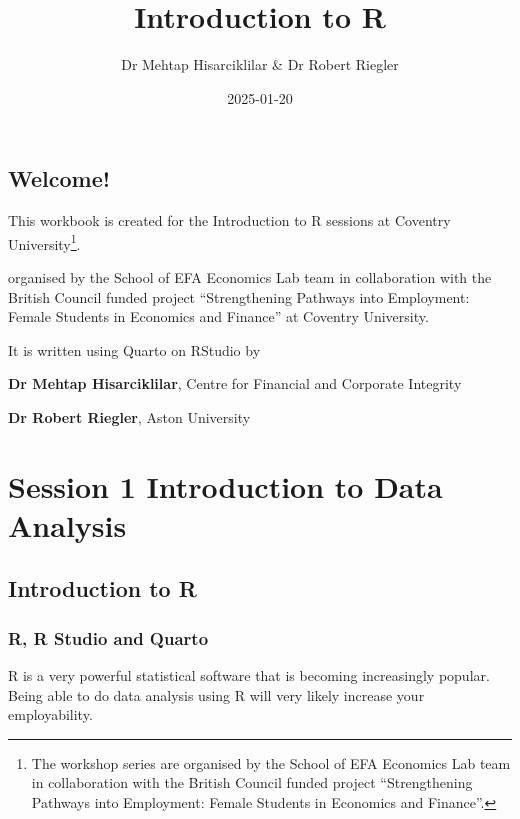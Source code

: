 \documentclass[
  letterpaper,
  DIV=11,
  numbers=noendperiod]{scrreprt}
\title{Introduction to R}
\author{Dr Mehtap Hisarciklilar \& Dr Robert Riegler}
\date{2025-01-20}
\renewcommand*\contentsname{Table of contents}
\newcommand\contentsname{Table of contents}
\begin{document}
\maketitle

\renewcommand*\contentsname{Table of contents}
{
\hypersetup{linkcolor=}
\setcounter{tocdepth}{2}
\tableofcontents
}


\chapter*{Welcome!}\label{welcome}


This workbook is created for the Introduction to R sessions at Coventry
University\footnote{The workshop series are organised by the School of
  EFA Economics Lab team in collaboration with the British Council
  funded project ``Strengthening Pathways into Employment: Female
  Students in Economics and Finance''.}.

organised by the School of EFA Economics Lab team in collaboration with
the British Council funded project ``Strengthening Pathways into
Employment: Female Students in Economics and Finance'' at Coventry
University.

It is written using Quarto on RStudio by

\textbf{Dr Mehtap Hisarciklilar}, Centre for Financial and Corporate
Integrity

\textbf{Dr Robert Riegler}, Aston University

\part{Session 1 Introduction to Data Analysis}

\chapter{Introduction to R}\label{introduction-to-r}

\section{R, R Studio and Quarto}\label{r-r-studio-and-quarto}

R is a very powerful statistical software that is becoming increasingly
popular. Being able to do data analysis using R will very likely
increase your employability.
\end{document}
